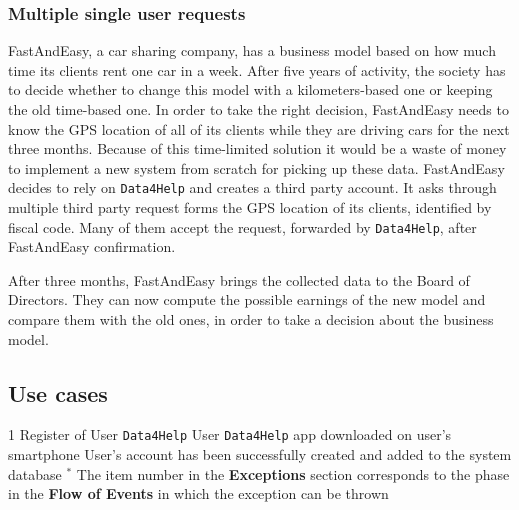     \subsubsection{Multiple single user requests}

      FastAndEasy, a car sharing company, has a business model based on how much time its clients rent one car in a week. After five years of activity, the society has to decide whether to change this model with a kilometers-based one or keeping the old time-based one. In order to take the right decision, FastAndEasy needs to know the GPS location of all of its clients while they are driving cars for the next three months. Because of this time-limited solution it would be a waste of money to implement a new system from scratch for picking up these data. FastAndEasy decides to rely on \texttt{Data4Help} and creates a third party account. It asks through multiple third party request forms the GPS location of its clients, identified by fiscal code. Many of them accept the request, forwarded by \texttt{Data4Help}, after FastAndEasy confirmation.

      After three months, FastAndEasy brings the collected data to the Board of Directors. They can now compute the possible earnings of the new model and compare them with the old ones, in order to take a decision about the business model.

  \clearpage
  \subsection{Use cases}

    \usecase %
      {1}
      {Register of User \texttt{Data4Help}}
      {User}
      {\texttt{Data4Help} app downloaded on user's smartphone}
      {}
      {User's account has been successfully created and added to the system database}
      {}
      {}
      {$^*$ The item number in the \textbf{Exceptions} section corresponds to the phase in the \textbf{Flow of Events} in which the exception can be thrown}


